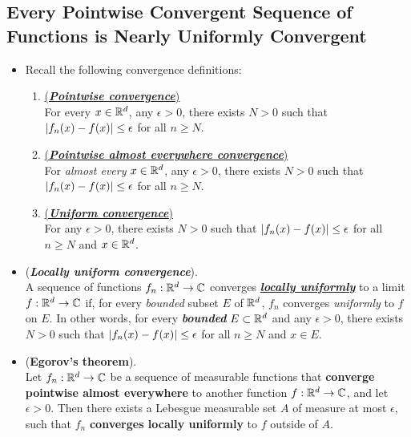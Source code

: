 \documentclass[11pt]{article}
\begin{document}
\subsection{Every Pointwise Convergent Sequence of Functions is Nearly Uniformly Convergent}
\begin{itemize}
\item \begin{remark} Recall the following convergence definitions:
\begin{enumerate}
\item \underline{(\emph{\textbf{Pointwise convergence}})}\\
 For every $x\in {\mathbb R}^{d}$, any $\epsilon > 0$, there exists $N > 0$ such that $\left\lvert f_n(x) - f(x) \right\rvert \le  \epsilon$ for all $n \ge N$.
\item \underline{(\emph{\textbf{Pointwise almost everywhere convergence}})}\\
 For \emph{almost every} $x\in {\mathbb R}^{d}$, any $\epsilon > 0$, there exists $N > 0$ such that $\left\lvert f_n(x) - f(x) \right\rvert \le  \epsilon$ for all $n \ge N$.
\item \underline{(\emph{\textbf{Uniform convergence}})}\\
For any $\epsilon > 0$, there exists $N > 0$ such that $\left\lvert f_n(x) - f(x) \right\rvert \le  \epsilon$ for all $n \ge N$ and $x \in {\mathbb R}^{d}$.
\end{enumerate}
\end{remark}

\item \begin{definition} (\emph{\textbf{Locally uniform convergence}}). \\
A sequence of functions $f_n : {\mathbb R}^d \rightarrow {\mathbb C}$ converges \underline{\emph{\textbf{locally uniformly}}} to a limit $f : {\mathbb R}^d \rightarrow {\mathbb C}$ if, for every \emph{bounded} subset $E$ of ${\mathbb R}^d$, $f_n$ converges \emph{uniformly} to $f$ on $E$. In other words, for every \emph{\textbf{bounded}} $E \subset {\mathbb R}^d$ and any $\epsilon > 0$, there exists $N > 0$ such that $\left\lvert f_n(x) - f(x) \right\rvert \le  \epsilon$ for all $n \ge N$ and $x \in E$.
\end{definition}

\item \begin{theorem}(\textbf{Egorov's theorem}).\\
Let $f_n : {\mathbb R}^d \rightarrow {\mathbb C}$ be a sequence of measurable functions that \textbf{converge pointwise almost everywhere} to another function $f : {\mathbb R}^d \rightarrow {\mathbb C}$, and let $\epsilon > 0$. Then there exists a Lebesgue measurable set $A$ of measure at most $\epsilon$, such that $f_n$ \textbf{converges locally uniformly} to $f$ outside of $A$.
\end{theorem}
\end{itemize}
\end{document}

